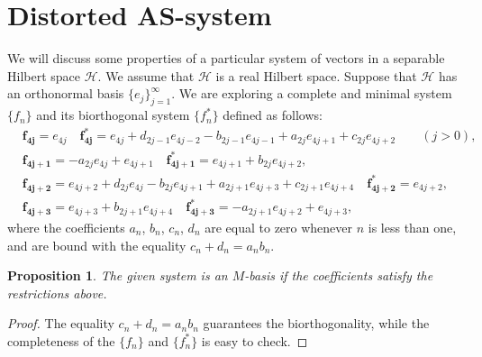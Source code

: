 \documentclass[12pt]{article}
\renewcommand{\cal}[1]{\mathcal{#1}}
\newtheorem{prop}{Proposition}
\theoremstyle{definition}
\numberwithin{remark}{section}
\numberwithin{theorem}{section}
\numberwithin{prop}{section}
\numberwithin{equation}{section}
\numberwithin{lemma}{section}
\numberwithin{prop_under_lemma}{lemma}
\begin{document}


\section{Distorted AS-system}
    We will discuss some properties of a particular system of vectors in a separable Hilbert space $\cal{H}$.
    We assume that $\cal{H}$ is a real Hilbert space. 
    Suppose that $\cal{H}$ has an orthonormal basis $\{e_j\}_{j=1}^\infty$.
    We are exploring a complete and minimal system $\{f_n\}$ and its biorthogonal system $\{f^*_n\}$ defined as follows:
    \begin{equation}
    \label{main-system}
    \begin{aligned}
      &\mathbf{f_{4j}} = e_{4j} \quad 
      \mathbf{f^*_{4j}} = e_{4j} + d_{2j - 1} e_{4j-2} - b_{2j-1} e_{4j-1} + a_{2j} e_{4j+1} + c_{2j} e_{4j+2} \qquad
      (j > 0),\\
      &\mathbf{f_{4j+1}} = -a_{2j} e_{4j} + e_{4j+1} \quad 
      \mathbf{f^*_{4j+1}} = e_{4j+1} + b_{2j} e_{4j+2},\\
      &\mathbf{f_{4j+2}} = e_{4j+2} + d_{2j} e_{4j} - b_{2j} e_{4j+1} + a_{2j+1} e_{4j+3} + c_{2j+1} e_{4j+4}\quad
      \mathbf{f^*_{4j+2}} = e_{4j+2},\\
      &\mathbf{f_{4j+3}} = e_{4j+3} + b_{2j+1} e_{4j+4}\quad
      \mathbf{f^*_{4j+3}} = -a_{2j+1} e_{4j+2} + e_{4j+3},
    \end{aligned}
    \end{equation}
    where the coefficients $a_n$, $b_n$, $c_n$, $d_n$ are equal to zero whenever $n$ is less than one, and are bound with the equality
    $c_n + d_n = a_n b_n$. 
    \begin{prop}
        The given system is an $M$-basis if the coefficients satisfy the restrictions above.
    \end{prop}
    \begin{proof}
        The equality $c_n + d_n = a_n b_n$ guarantees the bi\-orthogonality,
        while the completeness of the $\{f_n\}$ and $\{f_n^*\}$ is
        easy to check.
    \end{proof}
    
\end{document}
